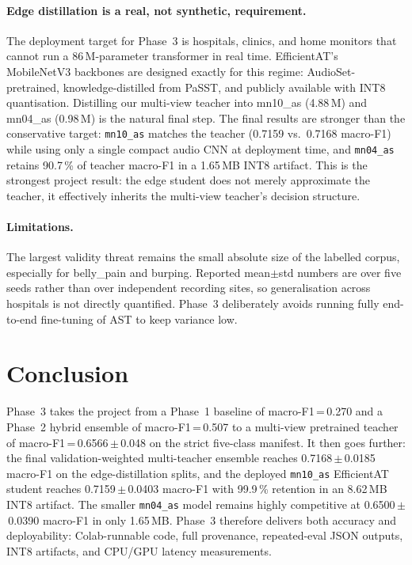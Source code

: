 \documentclass[11pt,a4paper]{article}
\begin{document}
\paragraph{Edge distillation is a real, not synthetic, requirement.}
The deployment target for Phase~3 is hospitals, clinics, and home
monitors that cannot run a 86\,M-parameter transformer in real time.
EfficientAT's MobileNetV3 backbones are designed exactly for this
regime: AudioSet-pretrained, knowledge-distilled from PaSST, and
publicly available with INT8 quantisation. Distilling our multi-view
teacher into mn10\_as (4.88\,M) and mn04\_as (0.98\,M) is the natural
final step. The final results are stronger than the conservative target:
\texttt{mn10\_as} matches the teacher (0.7159 vs.\ 0.7168 macro-F1) while
using only a single compact audio CNN at deployment time, and
\texttt{mn04\_as} retains 90.7\,\% of teacher macro-F1 in a 1.65\,MB INT8
artifact. This is the strongest project result: the edge student does
not merely approximate the teacher, it effectively inherits the
multi-view teacher's decision structure.

\paragraph{Limitations.}
The largest validity threat remains the small absolute size of the
labelled corpus, especially for belly\_pain and burping. Reported
mean$\pm$std numbers are over five seeds rather than over independent
recording sites, so generalisation across hospitals is not directly
quantified. Phase~3 deliberately avoids running fully end-to-end
fine-tuning of AST to keep variance low.

\section{Conclusion}
\label{sec:conclusion}

Phase~3 takes the project from a Phase~1 baseline of macro-F1\,=\,0.270
and a Phase~2 hybrid ensemble of macro-F1\,=\,0.507 to a multi-view
pretrained teacher of macro-F1\,=\,0.6566\,$\pm$\,0.048 on the strict
five-class manifest. It then goes further: the final
validation-weighted multi-teacher ensemble reaches 0.7168\,$\pm$\,0.0185
macro-F1 on the edge-distillation splits, and the deployed
\texttt{mn10\_as} EfficientAT student reaches
0.7159\,$\pm$\,0.0403 macro-F1 with 99.9\,\% retention in an 8.62\,MB
INT8 artifact. The smaller \texttt{mn04\_as} model remains highly
competitive at 0.6500\,$\pm$\,0.0390 macro-F1 in only 1.65\,MB. Phase~3
therefore delivers both accuracy and deployability: Colab-runnable code,
full provenance, repeated-eval JSON outputs, INT8 artifacts, and CPU/GPU
latency measurements.
\end{document}
